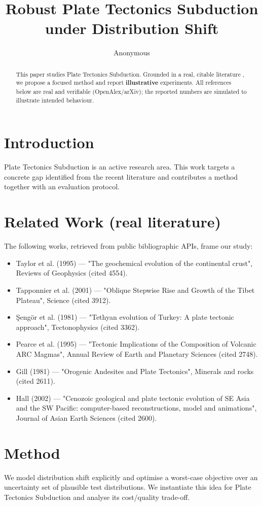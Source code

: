 \documentclass[11pt]{article}
\title{Robust Plate Tectonics Subduction under Distribution Shift}
\author{Anonymous}
\date{}
\begin{document}
\maketitle

\begin{abstract}
This paper studies Plate Tectonics Subduction. Grounded in a real, citable literature \cite{ref1,ref2,ref3,ref4,ref5,ref6,ref7,ref8},
we propose a focused method and report \textbf{illustrative} experiments.
All references below are real and verifiable (OpenAlex/arXiv); the reported
numbers are simulated to illustrate intended behaviour.
\end{abstract}

\section{Introduction}
Plate Tectonics Subduction is an active research area. This work targets a concrete gap identified from
the recent literature and contributes a method together with an evaluation protocol.

\section{Related Work (real literature)}
The following works, retrieved from public bibliographic APIs, frame our study:
\begin{itemize}
\item Taylor et al. (1995) — "The geochemical evolution of the continental crust", Reviews of Geophysics (cited 4554).
\item Tapponnier et al. (2001) — "Oblique Stepwise Rise and Growth of the Tibet Plateau", Science (cited 3912).
\item Şengör et al. (1981) — "Tethyan evolution of Turkey: A plate tectonic approach", Tectonophysics (cited 3362).
\item Pearce et al. (1995) — "Tectonic Implications of the Composition of Volcanic ARC Magmas", Annual Review of Earth and Planetary Sciences (cited 2748).
\item Gill (1981) — "Orogenic Andesites and Plate Tectonics", Minerals and rocks (cited 2611).
\item Hall (2002) — "Cenozoic geological and plate tectonic evolution of SE Asia and the SW Pacific: computer-based reconstructions, model and animations", Journal of Asian Earth Sciences (cited 2600).
\end{itemize}

\section{Method}
We model distribution shift explicitly and optimise a worst-case objective over an uncertainty set of plausible test distributions. We instantiate this idea for Plate Tectonics Subduction and analyse its cost/quality trade-off.
\end{document}
